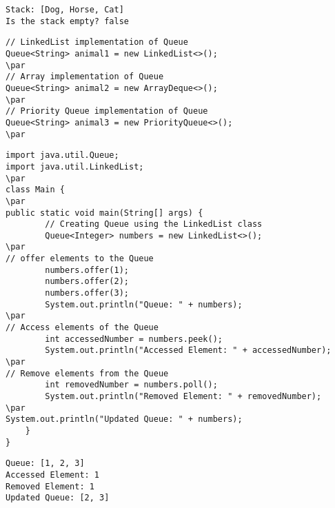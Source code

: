 \documentclass{book}
\def\lthtmlcheckvsize{\ifdim\ht\sizebox<\vsize 
  \ifdim\wd\sizebox<\hsize\expandafter\hfill\fi \expandafter\vfill
  \else\expandafter\vss\fi}%
\begin{document}
{\newpage\clearpage
{}%
\begin{lstlisting}
Stack: [Dog, Horse, Cat]
Is the stack empty? false
\end{lstlisting}%
\lthtmlfigureZ
\lthtmlcheckvsize\clearpage}

{\newpage\clearpage
{}%
\begin{lstlisting}
// LinkedList implementation of Queue
Queue<String> animal1 = new LinkedList<>();
\par
// Array implementation of Queue
Queue<String> animal2 = new ArrayDeque<>();
\par
// Priority Queue implementation of Queue
Queue<String> animal3 = new PriorityQueue<>();
\par
\end{lstlisting}%
\lthtmlfigureZ
\lthtmlcheckvsize\clearpage}

{\newpage\clearpage
{}%
\begin{lstlisting}
import java.util.Queue;
import java.util.LinkedList;
\par
class Main {
\par
public static void main(String[] args) {
        // Creating Queue using the LinkedList class
        Queue<Integer> numbers = new LinkedList<>();
\par
// offer elements to the Queue
        numbers.offer(1);
        numbers.offer(2);
        numbers.offer(3);
        System.out.println("Queue: " + numbers);
\par
// Access elements of the Queue
        int accessedNumber = numbers.peek();
        System.out.println("Accessed Element: " + accessedNumber);
\par
// Remove elements from the Queue
        int removedNumber = numbers.poll();
        System.out.println("Removed Element: " + removedNumber);
\par
System.out.println("Updated Queue: " + numbers);
    }
}
\end{lstlisting}%
\lthtmlfigureZ
\lthtmlcheckvsize\clearpage}

{\newpage\clearpage
{}%
\begin{lstlisting}
Queue: [1, 2, 3]
Accessed Element: 1
Removed Element: 1
Updated Queue: [2, 3]
\end{lstlisting}%
\lthtmlfigureZ
\lthtmlcheckvsize\clearpage}
\end{document}
